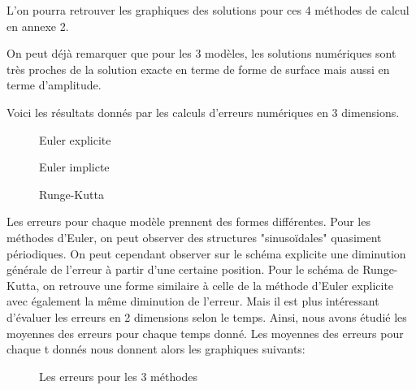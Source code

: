 L'on pourra retrouver les graphiques des solutions pour ces 4 méthodes de calcul en annexe 2.


On peut déjà remarquer que pour les 3 modèles, les solutions numériques sont très proches de la solution exacte en terme de forme de surface mais aussi en terme d'amplitude.


Voici les résultats donnés par les calculs d'erreurs numériques en 3 dimensions.
\begin{figure}[H]
\begin{minipage}[b]{.46\linewidth}
\centering{}
\caption{Euler explicite
    \label{fig1}
    }
\end{minipage} \hfill
\begin{minipage}[b]{.46\linewidth}
\centering{}
\caption{Euler implicte\label{fig2}}
\end{minipage}
\end{figure}


\begin{figure}[H]
\begin{center}
\begin{minipage}[b]{.46\linewidth}
\centering{}
\caption{Runge-Kutta\label{fig1}}
\end{minipage} \hfill
\end{center}
\end{figure}

Les erreurs pour chaque modèle prennent des formes différentes.
Pour les méthodes d'Euler, on peut observer des structures "sinusoïdales" quasiment périodiques. On peut cependant observer sur le schéma explicite une diminution générale de l'erreur à partir d'une certaine position.
Pour le schéma de Runge-Kutta, on retrouve une forme similaire à celle de la méthode d'Euler explicite avec également la même diminution de l'erreur.
\newline
Mais il est plus intéressant d'évaluer les erreurs en 2 dimensions selon le temps. Ainsi, nous avons étudié les moyennes des erreurs pour chaque temps donné.
\newline
Les moyennes des erreurs pour chaque t donnés nous donnent alors les graphiques suivants:

\begin{figure}[H]
\begin{center}
\centering{}
\caption{Les erreurs pour les 3 méthodes\label{fig1}}
\end{center}
\end{figure}

